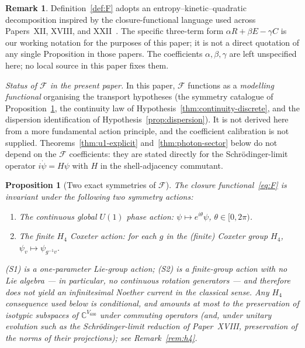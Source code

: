 \documentclass[11pt]{article}
\newtheorem{proposition}[theorem]{Proposition}
\theoremstyle{definition}
\newtheorem{remark}[theorem]{Remark}
\newcommand{\C}{\mathbb{C}}
\newcommand{\Fcal}{\mathcal{F}}
\begin{document}
\begin{remark}
Definition~\ref{def:F} adopts an entropy--kinetic--quadratic decomposition inspired by the closure-functional language used across Papers~XII, XVIII, and XXII~\citep{SmartXII, SmartXVIII, SmartXXII}. The specific three-term form $\alpha R + \beta E - \gamma C$ is our working notation for the purposes of this paper; it is not a direct quotation of any single Proposition in those papers. The coefficients $\alpha, \beta, \gamma$ are left unspecified here; no local source in this paper fixes them.

\noindent\emph{Status of $\Fcal$ in the present paper.} In this paper, $\Fcal$ functions as a \emph{modelling functional} organising the transport hypotheses (the symmetry catalogue of Proposition~\ref{prop:symmetries}, the continuity law of Hypothesis~\ref{thm:continuity-discrete}, and the dispersion identification of Hypothesis~\ref{prop:dispersion}). It is not derived here from a more fundamental action principle, and the coefficient calibration is not supplied. Theorems~\ref{thm:u1-explicit} and~\ref{thm:photon-sector} below do not depend on the $\Fcal$ coefficients: they are stated directly for the Schr\"{o}dinger-limit operator $i\dot\psi = H\psi$ with $H$ in the shell-adjacency commutant.
\end{remark}

\begin{proposition}[Two exact symmetries of $\Fcal$]\label{prop:symmetries}
The closure functional~\eqref{eq:F} is invariant under the following two symmetry actions:
\begin{enumerate}
    \item[\textup{(S1)}] The continuous global $U(1)$ phase action: $\psi \mapsto e^{i\theta} \psi$, $\theta \in [0, 2\pi)$.
    \item[\textup{(S2)}] The finite $H_4$ Coxeter action: for each $g$ in the (finite) Coxeter group $H_4$, $\psi_v \mapsto \psi_{g^{-1} v}$.
\end{enumerate}
(S1) is a one-parameter Lie-group action; (S2) is a finite-group action with no Lie algebra --- in particular, no continuous rotation generators --- and therefore does not yield an infinitesimal Noether current in the classical sense. Any $H_4$ consequence used below is conditional, and amounts at most to the preservation of isotypic subspaces of $\C^{V_{600}}$ under commuting operators (and, under unitary evolution such as the Schr\"{o}dinger-limit reduction of Paper~XVIII, preservation of the norms of their projections); see Remark~\ref{rem:h4}.
\end{proposition}
\end{document}
